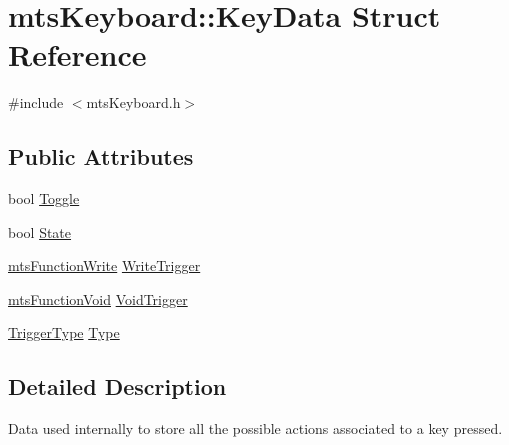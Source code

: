 \hypertarget{structmts_keyboard_1_1_key_data}{\section{mts\-Keyboard\-:\-:Key\-Data Struct Reference}
\label{structmts_keyboard_1_1_key_data}
}


{\ttfamily \#include $<$mts\-Keyboard.\-h$>$}

\subsection*{Public Attributes}
\begin{DoxyCompactItemize}
\item 
bool \hyperlink{structmts_keyboard_1_1_key_data_a7a7e12ddde72dfaa2f297a3a706d79e6}{Toggle}
\item 
bool \hyperlink{structmts_keyboard_1_1_key_data_a5903bc84ec70c923b46a43326ef55009}{State}
\item 
\hyperlink{classmts_function_write}{mts\-Function\-Write} \hyperlink{structmts_keyboard_1_1_key_data_a564f0bb039d8cd597235a73b9f06cf4c}{Write\-Trigger}
\item 
\hyperlink{classmts_function_void}{mts\-Function\-Void} \hyperlink{structmts_keyboard_1_1_key_data_a560e2370eb7f17e4c784e81d228e514a}{Void\-Trigger}
\item 
\hyperlink{classmts_keyboard_a4a455c544287ea2a16f3353a5fe379c4}{Trigger\-Type} \hyperlink{structmts_keyboard_1_1_key_data_ab2b6df8b50b8ada66a61e6412644e0d3}{Type}
\end{DoxyCompactItemize}


\subsection{Detailed Description}
Data used internally to store all the possible actions associated to a key pressed. 

